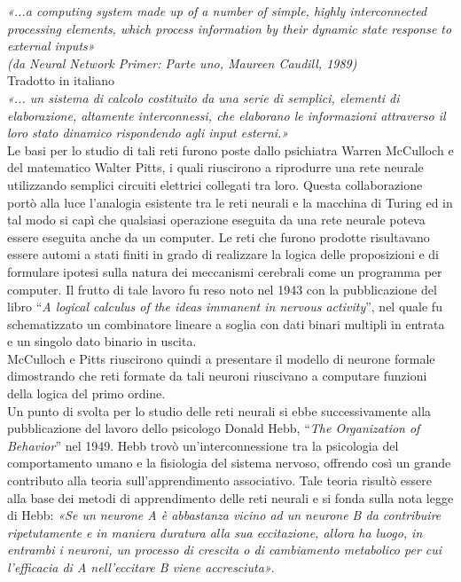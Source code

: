 \documentclass[12pt,a4paper,oneside]{book}
\begin{document}
		\textit{«...a computing system made up of a number of simple, highly interconnected processing elements, which process information by their dynamic state response to external inputs»}\\
		\textit{(da Neural Network Primer: Parte uno, Maureen Caudill, 1989)}\\
		
		Tradotto in italiano \\
		\textit{«... un sistema di calcolo costituito da una serie di semplici, elementi di elaborazione, altamente interconnessi, che elaborano le informazioni attraverso il loro stato dinamico rispondendo agli input esterni.»}\\
		
		Le basi per lo studio di tali reti furono poste dallo psichiatra Warren McCulloch e del matematico Walter Pitts, i quali riuscirono a riprodurre una rete neurale utilizzando semplici circuiti elettrici collegati tra loro. Questa collaborazione portò alla luce l'analogia esistente tra le reti neurali e la macchina di Turing ed in tal modo si capì che qualsiasi operazione eseguita da una rete neurale poteva essere eseguita anche da un computer. Le reti che furono prodotte risultavano essere automi a stati finiti in grado di realizzare la logica delle proposizioni e di formulare ipotesi sulla natura dei meccanismi cerebrali come un programma per computer. Il frutto di tale lavoro fu reso noto nel 1943 con la pubblicazione del libro ``\emph{A logical calculus of the ideas immanent in nervous activity}'', nel quale fu schematizzato un combinatore lineare a soglia con dati binari multipli in entrata e un singolo dato binario in uscita.\\
	    McCulloch e Pitts riuscirono quindi a presentare il modello di neurone formale dimostrando che reti formate da tali neuroni riuscivano a computare funzioni della logica del primo ordine.\\
	    Un punto di svolta per lo studio delle reti neurali si ebbe successivamente alla pubblicazione del lavoro dello psicologo Donald Hebb, ``\emph{The Organization of Behavior}'' nel 1949. Hebb trovò un'interconnessione tra la psicologia del comportamento umano e la fisiologia del sistema nervoso, offrendo così un grande contributo alla teoria sull'apprendimento associativo. Tale teoria  risultò essere alla base dei metodi di apprendimento delle reti neurali e si fonda sulla nota legge di Hebb: \textit{«Se un neurone A è abbastanza vicino ad un neurone B da contribuire ripetutamente e in maniera duratura alla sua eccitazione, allora ha luogo, in entrambi i neuroni, un processo di crescita o di cambiamento metabolico per cui l'efficacia di A nell'eccitare B viene accresciuta»}.\\
\end{document}
